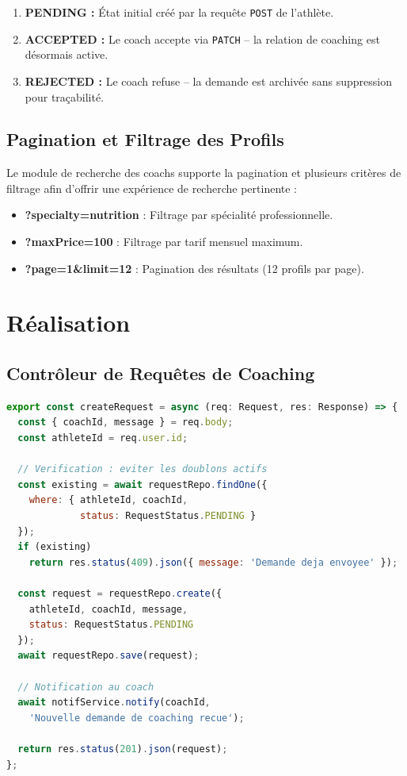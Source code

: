 \begin{enumerate}
    \item \textbf{PENDING :} État initial créé par la requête \texttt{POST} de l'athlète.
    \item \textbf{ACCEPTED :} Le coach accepte via \texttt{PATCH} -- la relation de coaching est désormais active.
    \item \textbf{REJECTED :} Le coach refuse -- la demande est archivée sans suppression pour traçabilité.
\end{enumerate}

\subsection{Pagination et Filtrage des Profils}
Le module de recherche des coachs supporte la pagination et plusieurs critères de filtrage afin d'offrir une expérience de recherche pertinente :
\begin{itemize}
    \item \textbf{?specialty=nutrition} : Filtrage par spécialité professionnelle.
    \item \textbf{?maxPrice=100} : Filtrage par tarif mensuel maximum.
    \item \textbf{?page=1\&limit=12} : Pagination des résultats (12 profils par page).
\end{itemize}

\section{Réalisation}

\subsection{Contrôleur de Requêtes de Coaching}
\begin{lstlisting}[language=JavaScript,
    caption=Extrait de CoachingRequestController.ts]
export const createRequest = async (req: Request, res: Response) => {
  const { coachId, message } = req.body;
  const athleteId = req.user.id;

  // Verification : eviter les doublons actifs
  const existing = await requestRepo.findOne({
    where: { athleteId, coachId,
             status: RequestStatus.PENDING }
  });
  if (existing)
    return res.status(409).json({ message: 'Demande deja envoyee' });

  const request = requestRepo.create({
    athleteId, coachId, message,
    status: RequestStatus.PENDING
  });
  await requestRepo.save(request);

  // Notification au coach
  await notifService.notify(coachId,
    'Nouvelle demande de coaching recue');

  return res.status(201).json(request);
};
\end{lstlisting}

